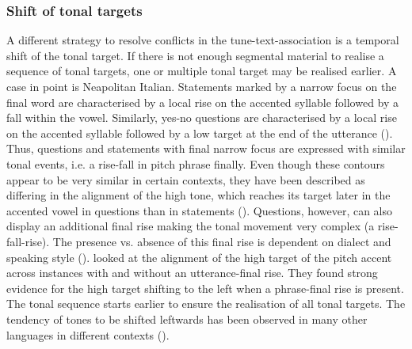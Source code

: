 \subsubsection{Shift of tonal targets}
A different strategy to resolve conflicts in the tune-text-association is a temporal shift of the tonal target. If there is not enough segmental material to realise a sequence of tonal targets, one or multiple tonal target may be realised earlier. A case in point is Neapolitan Italian. Statements marked by a narrow focus on the final word are characterised by a local rise on the accented syllable followed by a fall within the vowel. Similarly, yes-no questions are characterised by a local rise on the accented syllable followed by a low target at the end of the utterance (\citealt{Dimperio2001}). Thus, questions and statements with final narrow focus are expressed with similar tonal events, i.e. a rise-fall in pitch phrase finally. Even though these contours appear to be very similar in certain contexts, they have been described as differing in the alignment of the high tone, which reaches its target later in the accented vowel in questions than in statements (\citealt{DimperioHouse1997}). Questions, however, can also display an additional final rise making the tonal movement very complex (a rise-fall-rise). The presence vs. absence of this final rise is dependent on dialect and speaking style (\citealt{Savino2012}). \citet{CangemiGrice2016} looked at the alignment of the high target of the pitch accent across instances with and without an utterance-final rise. They found strong evidence for the high target shifting to the left when a phrase-final rise is present. The tonal sequence starts earlier to ensure the realisation of all tonal targets. The tendency of tones to be shifted leftwards has been observed in many other languages in different contexts (\citealt{Steele1986,CaspersHeuven1993,Dimperio2001,Prieto.etal2005,Schepman.etal2006,Muecke.etal2009}).

